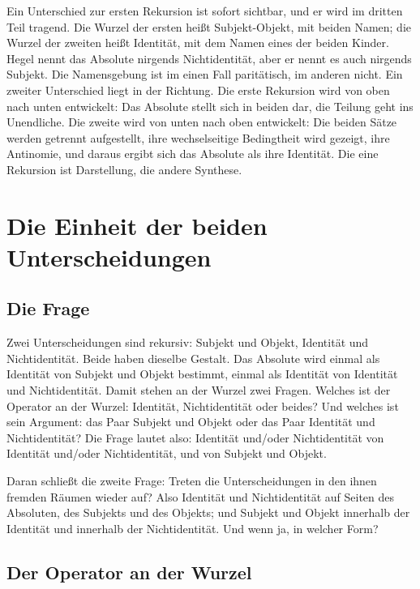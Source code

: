 \documentclass[11pt,a4paper]{article}
\newcommand{\SO}{Subjekt-Objekt}
\begin{document}
Ein Unterschied zur ersten Rekursion ist sofort sichtbar, und er wird im dritten Teil tragend. Die Wurzel der ersten heißt \SO{}, mit beiden Namen; die Wurzel der zweiten heißt Identität, mit dem Namen eines der beiden Kinder. Hegel nennt das Absolute nirgends Nichtidentität, aber er nennt es auch nirgends Subjekt. Die Namensgebung ist im einen Fall paritätisch, im anderen nicht. Ein zweiter Unterschied liegt in der Richtung. Die erste Rekursion wird von oben nach unten entwickelt: Das Absolute stellt sich in beiden dar, die Teilung geht ins Unendliche. Die zweite wird von unten nach oben entwickelt: Die beiden Sätze werden getrennt aufgestellt, ihre wechselseitige Bedingtheit wird gezeigt, ihre Antinomie, und daraus ergibt sich das Absolute als ihre Identität. Die eine Rekursion ist Darstellung, die andere Synthese.

\section{Die Einheit der beiden Unterscheidungen}

\subsection{Die Frage}

Zwei Unterscheidungen sind rekursiv: Subjekt und Objekt, Identität und Nichtidentität. Beide haben dieselbe Gestalt. Das Absolute wird einmal als Identität von Subjekt und Objekt bestimmt, einmal als Identität von Identität und Nichtidentität. Damit stehen an der Wurzel zwei Fragen. Welches ist der Operator an der Wurzel: Identität, Nichtidentität oder beides? Und welches ist sein Argument: das Paar Subjekt und Objekt oder das Paar Identität und Nichtidentität? Die Frage lautet also: Identität und/oder Nichtidentität von Identität und/oder Nichtidentität, und von Subjekt und Objekt.

Daran schließt die zweite Frage: Treten die Unterscheidungen in den ihnen fremden Räumen wieder auf? Also Identität und Nichtidentität auf Seiten des Absoluten, des Subjekts und des Objekts; und Subjekt und Objekt innerhalb der Identität und innerhalb der Nichtidentität. Und wenn ja, in welcher Form?

\subsection{Der Operator an der Wurzel}
\end{document}
